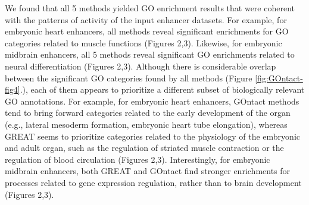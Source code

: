 We found that all 5 methods yielded GO enrichment results that were coherent with the patterns of activity of the input enhancer datasets. For example, for embryonic heart enhancers, all methods reveal significant enrichments for GO categories related to muscle functions (Figures 2,3). Likewise, for embryonic midbrain enhancers, all 5 methods reveal significant GO enrichments related to neural differentiation (Figures 2,3). Although there is considerable overlap between the significant GO categories found by all methods (Figure \ref{fig:GOntact-fig4}.), each of them appears to prioritize a different subset of biologically relevant GO annotations. For example, for embryonic heart enhancers, GOntact methods tend to bring forward categories related to the early development of the organ (e.g., lateral mesoderm formation, embryonic heart tube elongation), whereas GREAT seems to prioritize categories related to the physiology of the embryonic and adult organ, such as the regulation of striated muscle contraction or the regulation of blood circulation (Figures 2,3). Interestingly, for embryonic midbrain enhancers, both GREAT and GOntact find stronger enrichments for processes related to gene expression regulation, rather than to brain development (Figures 2,3).

